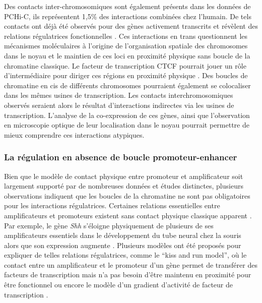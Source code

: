 Des contacts inter-chromosomiques sont également présents dans les données de \acrshort{PCHi-C}, ils représentent 1,5\% des interactions combinées chez l’humain. De tels contacts ont déjà été observés pour des gènes activement transcrits et révèlent des relations régulatrices fonctionnelles \citep{spilianakis_interchromosomal_2005}. Ces interactions en \gls{trans} questionnent les mécanismes moléculaires à l’origine de l’organisation spatiale des chromosomes dans le noyau et le maintien de ces loci en proximité physique sans boucle de la chromatine classique. Le facteur de transcription CTCF pourrait jouer un rôle d’intermédiaire pour diriger ces régions en proximité physique \citep{ling_ctcf_2006}. Des boucles de chromatine en \gls{cis} de différents chromosomes pourraient également se colocaliser dans les mêmes usines de transcription. Les contacts interchromosomiques observés seraient alors le résultat d’interactions indirectes via les usines de transcription. L’analyse de la co-expression de ces gènes, ainsi que l’observation en microscopie optique de leur localisation dans le noyau pourrait permettre de mieux comprendre ces interactions atypiques.

\subsubsection*{La régulation en absence de boucle promoteur-enhancer}
Bien que le modèle de contact physique entre promoteur et \gls{amplificateur} soit largement supporté par de nombreuses données et études distinctes, plusieurs observations indiquent que les boucles de la chromatine ne sont pas obligatoires pour les interactions régulatrices. Certaines relations essentielles entre \glspl{amplificateur} et promoteurs existent sans contact physique classique apparent \citep{alexander_live-cell_2019}. Par exemple, le gène \textit{Shh} s’éloigne physiquement de plusieurs de ses \glspl{amplificateur} essentiels dans le développement du tube neural chez la souris alors que son expression augmente \citep{benabdallah_decreased_2019}. Plusieurs modèles ont été proposés pour expliquer de telles relations régulatrices, comme le “kiss and run model”, où le contact entre un \gls{amplificateur} et le promoteur d’un gène permet de transférer des facteurs de transcription mais n’a pas besoin d’être maintenu en proximité pour être fonctionnel ou encore le modèle d’un gradient d’activité de facteur de transcription \citep{karr_transcription_2022}. \\

